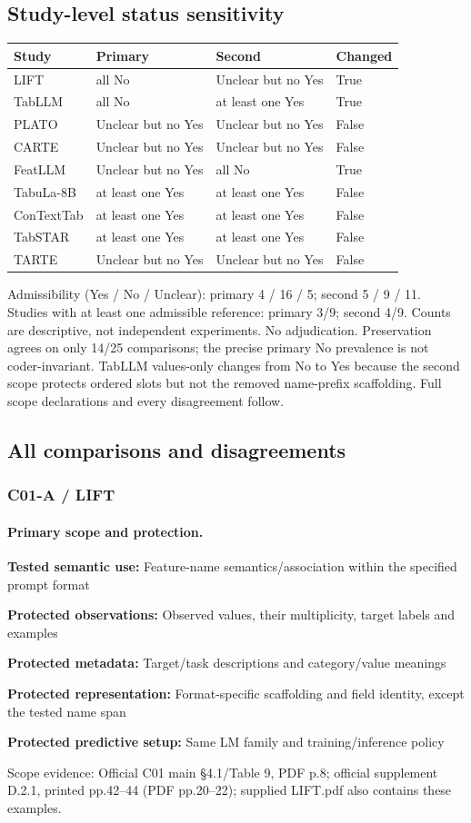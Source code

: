 \documentclass[10pt]{article}
\begin{document}
\subsection*{Study-level status sensitivity}
\begin{longtable}{p{.14\linewidth}p{.3\linewidth}p{.3\linewidth}l}\toprule Study & Primary & Second & Changed \\ \midrule\endhead
LIFT & all No & Unclear but no Yes & True \\
TabLLM & all No & at least one Yes & True \\
PLATO & Unclear but no Yes & Unclear but no Yes & False \\
CARTE & Unclear but no Yes & Unclear but no Yes & False \\
FeatLLM & Unclear but no Yes & all No & True \\
TabuLa-8B & at least one Yes & at least one Yes & False \\
ConTextTab & at least one Yes & at least one Yes & False \\
TabSTAR & at least one Yes & at least one Yes & False \\
TARTE & Unclear but no Yes & Unclear but no Yes & False \\
\bottomrule\end{longtable}
Admissibility (Yes / No / Unclear): primary 4 / 16 / 5; second 5 / 9 / 11. Studies with at least one admissible reference: primary 3/9; second 4/9. Counts are descriptive, not independent experiments. No adjudication. Preservation agrees on only 14/25 comparisons; the precise primary No prevalence is not coder-invariant. TabLLM values-only changes from No to Yes because the second scope protects ordered slots but not the removed name-prefix scaffolding. Full scope declarations and every disagreement follow.
\subsection*{All comparisons and disagreements}
\subsubsection*{C01-A / LIFT}
\paragraph{Primary scope and protection.}
\textbf{Tested semantic use:} Feature-name semantics/association within the specified prompt format\par
\textbf{Protected observations:} Observed values, their multiplicity, target labels and examples\par
\textbf{Protected metadata:} Target/task descriptions and category/value meanings\par
\textbf{Protected representation:} Format-specific scaffolding and field identity, except the tested name span\par
\textbf{Protected predictive setup:} Same LM family and training/inference policy\par
Scope evidence: Official C01 main §4.1/Table 9, PDF p.8; official supplement D.2.1, printed pp.42--44 (PDF pp.20--22); supplied LIFT.pdf also contains these examples.\par
\end{document}
